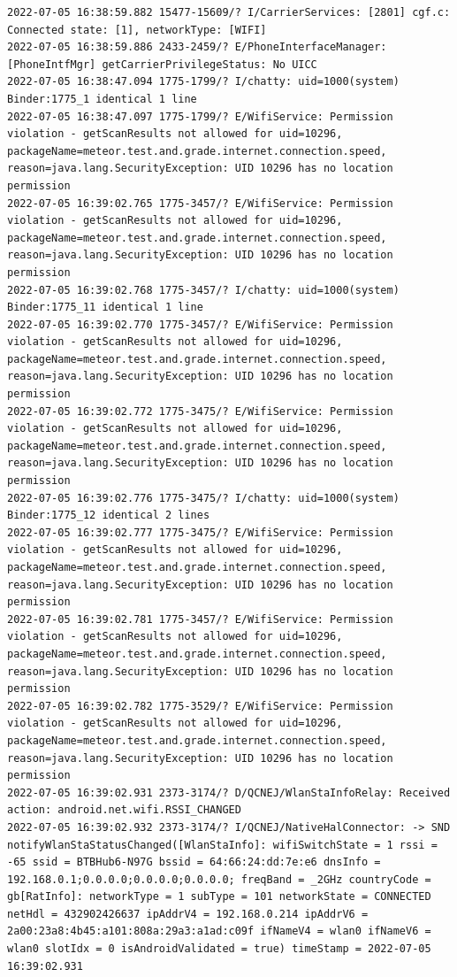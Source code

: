 \documentclass[a4paper,12pt]{book}
\begin{document}
\begin{lstlisting}
2022-07-05 16:38:59.882 15477-15609/? I/CarrierServices: [2801] cgf.c: Connected state: [1], networkType: [WIFI]
2022-07-05 16:38:59.886 2433-2459/? E/PhoneInterfaceManager: [PhoneIntfMgr] getCarrierPrivilegeStatus: No UICC
2022-07-05 16:38:47.094 1775-1799/? I/chatty: uid=1000(system) Binder:1775_1 identical 1 line
2022-07-05 16:38:47.097 1775-1799/? E/WifiService: Permission violation - getScanResults not allowed for uid=10296, packageName=meteor.test.and.grade.internet.connection.speed, reason=java.lang.SecurityException: UID 10296 has no location permission
2022-07-05 16:39:02.765 1775-3457/? E/WifiService: Permission violation - getScanResults not allowed for uid=10296, packageName=meteor.test.and.grade.internet.connection.speed, reason=java.lang.SecurityException: UID 10296 has no location permission
2022-07-05 16:39:02.768 1775-3457/? I/chatty: uid=1000(system) Binder:1775_11 identical 1 line
2022-07-05 16:39:02.770 1775-3457/? E/WifiService: Permission violation - getScanResults not allowed for uid=10296, packageName=meteor.test.and.grade.internet.connection.speed, reason=java.lang.SecurityException: UID 10296 has no location permission
2022-07-05 16:39:02.772 1775-3475/? E/WifiService: Permission violation - getScanResults not allowed for uid=10296, packageName=meteor.test.and.grade.internet.connection.speed, reason=java.lang.SecurityException: UID 10296 has no location permission
2022-07-05 16:39:02.776 1775-3475/? I/chatty: uid=1000(system) Binder:1775_12 identical 2 lines
2022-07-05 16:39:02.777 1775-3475/? E/WifiService: Permission violation - getScanResults not allowed for uid=10296, packageName=meteor.test.and.grade.internet.connection.speed, reason=java.lang.SecurityException: UID 10296 has no location permission
2022-07-05 16:39:02.781 1775-3457/? E/WifiService: Permission violation - getScanResults not allowed for uid=10296, packageName=meteor.test.and.grade.internet.connection.speed, reason=java.lang.SecurityException: UID 10296 has no location permission
2022-07-05 16:39:02.782 1775-3529/? E/WifiService: Permission violation - getScanResults not allowed for uid=10296, packageName=meteor.test.and.grade.internet.connection.speed, reason=java.lang.SecurityException: UID 10296 has no location permission
2022-07-05 16:39:02.931 2373-3174/? D/QCNEJ/WlanStaInfoRelay: Received action: android.net.wifi.RSSI_CHANGED
2022-07-05 16:39:02.932 2373-3174/? I/QCNEJ/NativeHalConnector: -> SND notifyWlanStaStatusChanged([WlanStaInfo]: wifiSwitchState = 1 rssi = -65 ssid = BTBHub6-N97G bssid = 64:66:24:dd:7e:e6 dnsInfo = 192.168.0.1;0.0.0.0;0.0.0.0;0.0.0.0; freqBand = _2GHz countryCode = gb[RatInfo]: networkType = 1 subType = 101 networkState = CONNECTED netHdl = 432902426637 ipAddrV4 = 192.168.0.214 ipAddrV6 = 2a00:23a8:4b45:a101:808a:29a3:a1ad:c09f ifNameV4 = wlan0 ifNameV6 = wlan0 slotIdx = 0 isAndroidValidated = true) timeStamp = 2022-07-05 16:39:02.931

\end{lstlisting}
\end{document}
